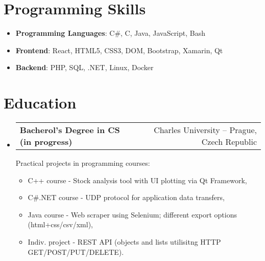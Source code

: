 \documentclass[letterpaper,11pt]{article}
\makeatletter
\newcommand{\sitem}[1]{\item #1 \vspace{-2pt}}
\newcommand{\resumeSubheading}[4]{
  \vspace{-1pt}\item
    \begin{tabular*}{0.97\textwidth}[t]{l@{\extracolsep{\fill}}r}
      \textbf{#1} & #2 \\
      \textit{\small#3} & \textit{\small #4} \\
    \end{tabular*}\vspace{-5pt}
}
\newcommand{\resumeSubheadingg}[2]{
  \vspace{-1pt}\item
    \begin{tabular*}{0.97\textwidth}[t]{l@{\extracolsep{\fill}}r}
      \textbf{#1} & #2
    \end{tabular*}\vspace{-5pt}
}
\newenvironment{subheadingListing}{\begin{itemize}[leftmargin=*]}{\end{itemize}}
\newenvironment{resumeList}{\begin{itemize}}{\end{itemize}\vspace{-5pt}}
\newcommand{\CC}{C\nolinebreak\hspace{-.05em}\raisebox{.4ex}{\tiny\bf +}\nolinebreak\hspace{-.10em}\raisebox{.4ex}{\tiny\bf +}}
\makeatother
\begin{document}
\begin{subheadingListing}


\end{subheadingListing}


\section{Programming Skills}
\begin{subheadingListing}
  \sitem{
    \textbf{Programming Languages}{: C\#, \CC, Java, JavaScript, Bash}
  }
  \sitem{
    \textbf{Frontend}{: React, HTML5, CSS3, DOM, Bootstrap, Xamarin, Qt}
  }
  \sitem{
    \textbf{Backend}{: PHP, SQL, .NET, Linux, Docker}
  }
\end{subheadingListing}


\section{Education}
\begin{subheadingListing}

  \resumeSubheadingg
  {Bacherol's Degree in CS (in progress)}{Charles University – Prague, Czech Republic}

  Practical projects in programming courses:
  \begin{resumeList}
    \sitem{C++ course - Stock analysis tool with UI plotting via Qt Framework,}
    \sitem{C\#.NET course - UDP protocol for application data transfers,}
    \sitem{Java course - Web scraper using Selenium; different export options (html+css/csv/xml),}
    \sitem{Indiv. project - REST API (objects and lists utilisitng HTTP GET/POST/PUT/DELETE).}
  \end{resumeList}
\end{subheadingListing}
\end{document}
